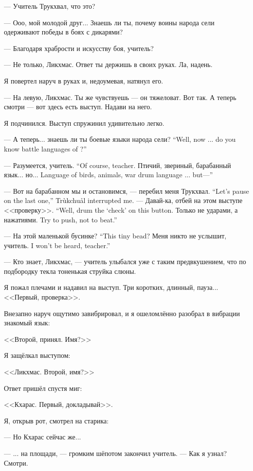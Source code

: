 --- Учитель Трукхвал, что это?

--- Ооо, мой молодой друг...
Знаешь ли ты, почему воины народа сели одерживают победы в боях с дикарями?

--- Благодаря храбрости и искусству боя, учитель?

--- Не только, Ликхмас.
Ответ ты держишь в своих руках.
Ла, надень.

Я повертел наруч в руках и, недоумевая, натянул его.

--- На левую, Ликхмас.
Ты же чувствуешь --- он тяжеловат.
Вот так.
А теперь смотри --- вот здесь есть выступ.
Надави на него.

Я подчинился.
Выступ спружинил удивительно легко.

{--- А теперь... знаешь ли ты боевые языки народа сели?}
{``Well, now ... do you know battle languages of \Seli?''}

{--- Разумеется, учитель.}
{``Of course, teacher.}
{Птичий, звериный, барабанный язык... но...}
{Language of birds, animals, war drum language ... but---''}

{--- Вот на барабанном мы и остановимся, --- перебил меня Трукхвал.}
{``Let's pause on the last one,'' Tr\`{u}kchu\r{a}l interrupted me.}
{--- Давай-ка, отбей на этом выступе <<проверку>>.}
{``Well, drum the `check' on this button.}
{Только не ударами, а нажатиями.}
{Try to push, not to beat.''}

{--- На этой маленькой бусинке?}
{``This tiny bead?}
{Меня никто не услышит, учитель.}
{I won't be heard, teacher.''}

--- Кто знает, Ликхмас, --- учитель улыбался уже с таким предвкушением, что по подбородку текла тоненькая струйка слюны.

Я пожал плечами и надавил на выступ.
Три коротких, длинный, пауза...
<<Первый, проверка>>.

Внезапно наруч ощутимо завибрировал, и я ошеломлённо разобрал в вибрации знакомый язык:

<<Второй, принял.
Имя?>>

Я защёлкал выступом:

<<Ликхмас.
Второй, имя?>>

Ответ пришёл спустя миг:

<<Кхарас.
Первый, докладывай>>.

Я, открыв рот, смотрел на старика:

--- Но Кхарас сейчас же...

--- ... на площади, --- громким шёпотом закончил учитель.
--- Как я узнал?
Смотри.

